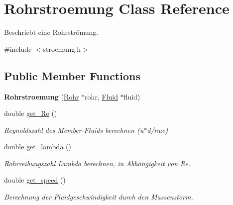 \hypertarget{class_rohrstroemung}{}\section{Rohrstroemung Class Reference}
\label{class_rohrstroemung}


Beschriebt eine Rohrströmung.  




{\ttfamily \#include $<$stroemung.\+h$>$}

\subsection*{Public Member Functions}
\begin{DoxyCompactItemize}
\item 
\mbox{\label{class_rohrstroemung_aa8ee146566f18b2a4ca4cbfc1946c2b8}} 
{\bfseries Rohrstroemung} (\hyperlink{class_rohr}{Rohr} $\ast$rohr, \hyperlink{class_fluid}{Fluid} $\ast$fluid)
\item 
\mbox{\label{class_rohrstroemung_aa491056aa77acac305aca0fde9c3e8bc}} 
double \hyperlink{class_rohrstroemung_aa491056aa77acac305aca0fde9c3e8bc}{get\+\_\+\+Re} ()
\begin{DoxyCompactList}\small\item\em Reynoldszahl des Member-\/\+Fluids berechnen (u$\ast$d/nue) \end{DoxyCompactList}\item 
double \hyperlink{class_rohrstroemung_a7ea25aca94625ef68bf856d957419d26}{get\+\_\+lambda} ()
\begin{DoxyCompactList}\small\item\em Rohrreibungszahl Lambda berechnen, in Abhängigkeit von Re. \end{DoxyCompactList}\item 
\mbox{\label{class_rohrstroemung_aa4f7d016ed9f920b8e8f0c9bdbae5213}} 
double \hyperlink{class_rohrstroemung_aa4f7d016ed9f920b8e8f0c9bdbae5213}{get\+\_\+speed} ()
\begin{DoxyCompactList}\small\item\em Berechnung der Fluidgeschwindigkeit durch den Massenstorm. \end{DoxyCompactList}\item 
\mbox{\label{class_rohrstroemung_ac4d2f31e451f1a3c97627d3a87df419d}} 

\end{DoxyCompactItemize}
